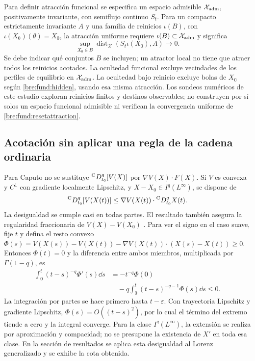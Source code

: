 Para definir atracción funcional se especifica un espacio admisible
$\mathcal X_{\rm adm}$, positivamente invariante, con semiflujo continuo
$S_t$. Para un compacto estrictamente invariante $A$ y una familia
de reinicios $\iota(B)$, con $\iota(X_0)(\theta)=X_0$, la atracción uniforme
requiere $\iota(B)\subset\mathcal X_{\rm adm}$ y
significa
\begin{equation}
 \sup_{X_0\in B}\operatorname{dist}_{\mathcal X}
       (S_t\iota(X_0),A)\longrightarrow0.
 \label{bre:fund:resetattraction}
\end{equation}
Se debe indicar qué conjuntos $B$ se incluyen; un atractor local no tiene
que atraer todos los reinicios acotados. La ocultedad funcional excluye
vecindades de los perfiles de equilibrio en $\mathcal X_{\rm adm}$.
La ocultedad bajo reinicio excluye bolas de $X_0$ según
\eqref{bre:fund:hidden}, usando esa misma atracción. Los sondeos
numéricos de este estudio exploran reinicios finitos y destinos observables;
no construyen por sí solos un espacio funcional admisible ni verifican
la convergencia uniforme de \eqref{bre:fund:resetattraction}.

\subsection{Acotación sin aplicar una regla de la cadena ordinaria}

Para Caputo no se sustituye ${}^{\mathrm C}D_{t_0}^{q}[V(X)]$ por
$\nabla V(X)\cdot F(X)$. Si $V$ es convexa y $C^1$ con gradiente
localmente Lipschitz, y $X-X_0\in I^q(L^\infty)$, se dispone de
\begin{equation}
 {}^{\mathrm C}D_{t_0}^{q}[V(X(t))]\le\nabla V(X(t))\cdot{}^{\mathrm C}D_{t_0}^{q}X(t).
 \label{bre:fund:convex}
\end{equation}
La desigualdad se cumple casi en todas partes. El resultado también asegura la regularidad fraccionaria de
$V(X)-V(X_0)$ \cite{Gomoyunov2018Convex}. Para ver el signo en el caso
suave, fije $t$ y defina el resto convexo
$\Phi(s)=V(X(s))-V(X(t))-\nabla V(X(t))\cdot(X(s)-X(t))\ge0$.
Entonces $\Phi(t)=0$ y la diferencia entre ambos miembros, multiplicada
por $\Gamma(1-q)$, es
\begin{align}
 \int_0^t(t-s)^{-q}\Phi'(s)\dd s
 &=-t^{-q}\Phi(0)\nonumber\\
 &\quad-q\int_0^t(t-s)^{-q-1}\Phi(s)\dd s\le0.
 \label{bre:fund:convexproof}
\end{align}
La integración por partes se hace primero hasta $t-\varepsilon$.
Con trayectoria Lipschitz y gradiente Lipschitz,
$\Phi(s)=O((t-s)^2)$, por lo cual el término del extremo tiende a cero
y la integral converge. Para la clase $I^q(L^\infty)$, la extensión se
realiza por aproximación y compacidad; no se presupone la existencia de
$X'$ en toda esa clase. En la sección de resultados se aplica esta
desigualdad al Lorenz generalizado y se exhibe la cota obtenida.


